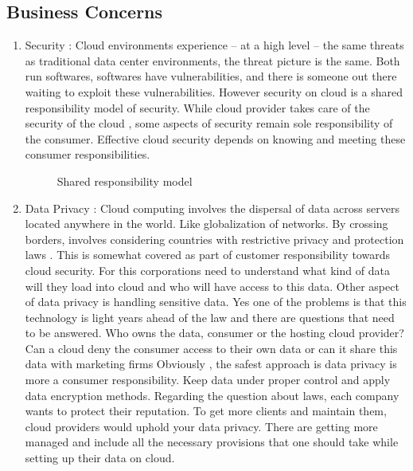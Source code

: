 \documentclass[journal]{hybrid-cloud}
\begin{document}
\subsection{Business Concerns}
\begin{enumerate}
	\item Security  : Cloud environments experience – at a high level – the same threats as traditional data center environments, the threat picture is the same. Both run softwares, softwares have vulnerabilities, and there is someone out there waiting to exploit these vulnerabilities. However security on cloud is a shared responsibility model of security. While cloud provider takes care of the security of the cloud , some aspects of security remain sole responsibility of the consumer. Effective cloud security depends
on knowing and meeting these consumer responsibilities.  \cite{cloudno}
\cite{shared_res_pic}

\begin{figure}[h]
	\caption{\label{fig:shared_responsibility_model} Shared responsibility model}%
\end{figure}


	\item Data Privacy : Cloud computing involves the dispersal of data across servers located anywhere in
the world. Like globalization of networks. By crossing borders, involves considering
countries with restrictive privacy and protection laws . This is somewhat covered as
part of customer responsibility towards cloud security. For this corporations need to
understand what kind of data will they load into cloud and who will have access to
this data. \cite{DataPrivacy}
Other aspect of data privacy is handling sensitive data. Yes one of the problems is
that this technology is light years ahead of the law and there are questions that need
to be answered. Who owns the data, consumer or the hosting cloud provider? Can
a cloud deny the consumer access to their own data or can it share this data with
marketing firms Obviously , the safest approach is data privacy is more a consumer
responsibility. Keep data under proper control and apply data encryption methods.
Regarding the question about laws, each company wants to protect their reputation.
To get more clients and maintain them, cloud providers would uphold your data
privacy. There are getting more managed and include all the necessary provisions
that one should take while setting up their data on cloud. \cite{DataPrivacy2} 


\end{enumerate}
\end{document}

